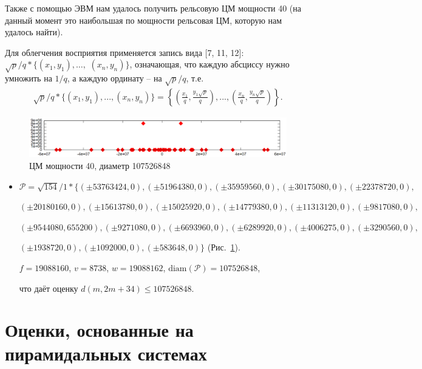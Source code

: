 \documentclass[12pt]{article}
\begin{document}
Также с помощью ЭВМ нам удалось получить рельсовую ЦМ мощности 40 (на данный момент это наибольшая по мощности рельсовая ЦМ, которую нам удалось найти).

Для облегчения восприятия применяется запись вида
[7, 11, 12]:
$\sqrt{p}/q * \{ (x_1,y_1), \ldots,$ $ (x_n, y_n)  \}$,
означающая, что каждую абсциссу нужно умножить на $1/q$,
а каждую ординату -- на $\sqrt{p}/q$, т.е.
\begin{align} \label{notation}
	\sqrt{p}/q * \{ (x_1,y_1), ..., (x_n, y_n)  \}
	=
	\left\{ \left(\frac{x_1}{q},\frac{y_1\sqrt{p}}{q}\right), ..., \left(\frac{x_n}{q},   \frac{y_n\sqrt{p}}{q}\right)  \right\}.
\end{align}

\begin{figure}[h!]
	\begin{center}
	\includegraphics[width=1.1\linewidth]{picture_40.png}
	\parbox{1\linewidth}{\caption{ЦМ мощности 40, диаметр 107526848}
	\label{picture_40.png}}
	\end{center}
\end{figure}

\begin{itemize}
\setlength{\itemsep}{-1mm}

\item
$\mathcal{P}=\sqrt{154}/{1} * \{ (\pm 53763424, 0),
(\pm 51964380 , 0),
(\pm 35959560 , 0),
(\pm 30175080 , 0),
(\pm 22378720 , 0),
$

$
(\pm 20180160 , 0),
(\pm 15613780 , 0),
(\pm 15025920 , 0),
(\pm 14779380 , 0),
(\pm 11313120 , 0),
(\pm 9817080 , 0),
$

$
(\pm 9544080 , 655200),
(\pm 9271080 , 0),
(\pm 6693960 , 0),
(\pm 6289920 , 0),
(\pm 4006275 , 0),
(\pm 3290560 , 0),
$

$
(\pm 1938720 , 0),
(\pm 1092000 , 0),
(\pm 583648 , 0)\}
$
(Рис.~\ref{picture_40.png}).

$f = 19088160$, $v = 8738$, $w = 19088162$, $\operatorname{diam(\mathcal{P})}
= 107526848$,

что даёт оценку $d(m, 2m + 34) \leq 107526848$.

\end{itemize}


\section{Оценки, основанные на пирамидальных системах}
\end{document}

